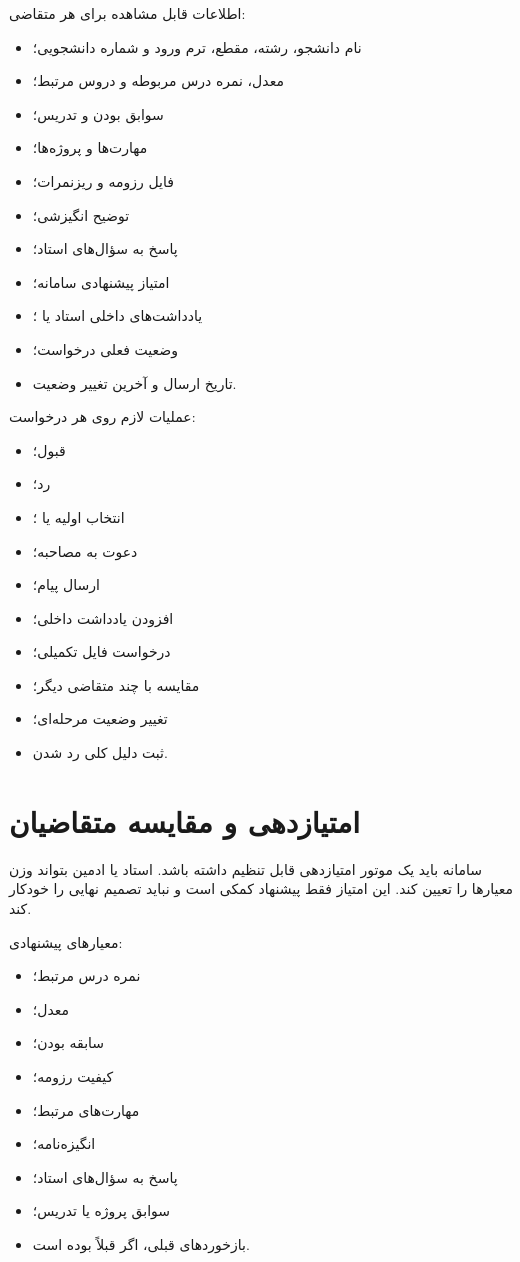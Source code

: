 \documentclass[12pt,a4paper]{article}
\begin{document}
اطلاعات قابل مشاهده برای هر متقاضی:
\begin{itemize}
\item نام دانشجو، رشته، مقطع، ترم ورود و شماره دانشجویی؛
\item معدل، نمره درس مربوطه و دروس مرتبط؛
\item سوابق  بودن و تدریس؛
\item مهارت‌ها و پروژه‌ها؛
\item فایل رزومه و ریزنمرات؛
\item توضیح انگیزشی؛
\item پاسخ به سؤال‌های استاد؛
\item امتیاز پیشنهادی سامانه؛
\item یادداشت‌های داخلی استاد یا ؛
\item وضعیت فعلی درخواست؛
\item تاریخ ارسال و آخرین تغییر وضعیت.
\end{itemize}

عملیات لازم روی هر درخواست:
\begin{itemize}
\item قبول؛
\item رد؛
\item انتخاب اولیه یا ؛
\item دعوت به مصاحبه؛
\item ارسال پیام؛
\item افزودن یادداشت داخلی؛
\item درخواست فایل تکمیلی؛
\item مقایسه با چند متقاضی دیگر؛
\item تغییر وضعیت مرحله‌ای؛
\item ثبت دلیل کلی رد شدن.
\end{itemize}

\section{امتیازدهی و مقایسه متقاضیان}
سامانه باید یک موتور امتیازدهی قابل تنظیم داشته باشد. استاد یا ادمین بتواند وزن معیارها را تعیین کند. این امتیاز فقط پیشنهاد کمکی است و نباید تصمیم نهایی را خودکار کند.

معیارهای پیشنهادی:
\begin{itemize}
\item نمره درس مرتبط؛
\item معدل؛
\item سابقه  بودن؛
\item کیفیت رزومه؛
\item مهارت‌های مرتبط؛
\item انگیزه‌نامه؛
\item پاسخ به سؤال‌های استاد؛
\item سوابق پروژه یا تدریس؛
\item بازخوردهای قبلی، اگر قبلاً  بوده است.
\end{itemize}
\end{document}
